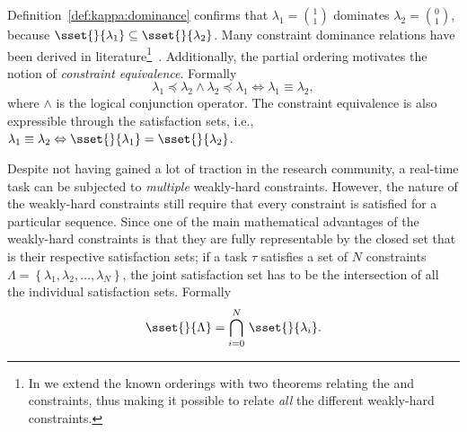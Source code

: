 %
Definition~\ref{def:kappa:dominance} confirms that $\lambda_1 = \binom{1}{1}$ dominates $\lambda_2 = \binom{0}{1}$, because $\sset{}{\lambda_1} \subseteq \sset{}{\lambda_2}$.
Many constraint dominance relations have been derived in literature\footnote{In  we extend the known orderings with two theorems relating the \tAH{} and \tRH{} constraints, thus making it possible to relate \emph{all} the different weakly-hard constraints.}~\cite{Bernat:2001}.
Additionally, the partial ordering motivates the notion of \emph{constraint equivalence}.
Formally
%
\begin{equation}
    \lambda_1 \preceq \lambda_2 \land \lambda_2 \preceq \lambda_1 \Leftrightarrow \lambda_1 \equiv \lambda_2,
\end{equation}
%
where $\land$ is the logical conjunction operator.
The constraint equivalence is also expressible through the satisfaction sets, i.e., $\lambda_1 \equiv \lambda_2 \Leftrightarrow \sset{}{\lambda_1} = \sset{}{\lambda_2}$.

Despite not having gained a lot of traction in the research community, a real-time task can be subjected to \emph{multiple} weakly-hard constraints.
However, the nature of the weakly-hard constraints still require that every constraint is satisfied for a particular sequence.
Since one of the main mathematical advantages of the weakly-hard constraints is that they are fully representable by the closed set that is their respective satisfaction sets; if a task $\tau$ satisfies a set of $N$ constraints $\Lambda = \left\{ \lambda_1, \lambda_2, \ldots, \lambda_N \right\}$, the joint satisfaction set has to be the intersection of all the individual satisfaction sets.
Formally
%
\begin{equation}
    \sset{}{\Lambda} = \bigcap_{i=0}^N \, \sset{}{\lambda_i}.
\end{equation}

\begin{figure}[t]
    \centering
    
    \caption{}
    \label{fig:schedule}
\end{figure}

